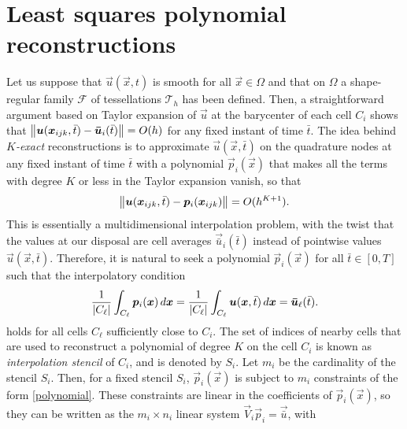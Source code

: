 \section{Least squares polynomial reconstructions}
\label{sec:ls-polynomial-reconstructions}
Let us suppose that $\vec{u}(\vec{x},t)$ is smooth for all $\vec{x}\in\Omega$
and that on $\Omega$ a shape-regular family $\mathcal{F}$ of tessellations
$\mathcal{T}_h$ has been defined.
Then, a straightforward argument based on Taylor expansion of $\vec{u}$ at the
barycenter of each cell $C_{i}$ shows that
$\left\lVert \bm{u}(\bm{x}_{ijk},\bar{t})-\bm{\bar{u}}_{i}(\bar{t}) \right\rVert = O(h)$
for any fixed instant of time $\bar{t}$. The idea behind \emph{$K$-exact}
reconstructions is to approximate $\vec{u}(\vec{x},\bar{t})$ on the quadrature
nodes at any fixed instant of time $\bar{t}$ with a polynomial $\vec{p}_{i}(\vec{x})$
that makes all the terms with degree $K$ or less in the Taylor expansion vanish,
so that
\[
\left\lVert \bm{u}(\bm{x}_{ijk},\bar{t}) - \bm{p}_{i}(\bm{x}_{ijk}) \right\rVert = O(h^{K+1}).
\]
This is essentially a multidimensional interpolation problem, with the twist
that the values at our disposal are cell averages $\vec{\bar{u}}_{i}(\bar{t})$
instead of pointwise values $\vec{u}(\vec{x},\bar{t})$. Therefore, it is natural
to seek a polynomial $\vec{p}_i(\vec{x})$ for all $\bar{t}\in[0,T]$ such that the
interpolatory condition
\begin{equation} \label{polynomial}
\frac{1}{\left|C_{\ell}\right|}\int_{C_{\ell}}\bm{p}_i(\bm{x}) \, d\bm{x}
=\frac{1}{\left|C_{\ell}\right|}\int_{C_{\ell}}\bm{u}(\bm{x},\bar{t}) \, d\bm{x}
=\bm{\bar{u}}_{\ell}(\bar{t}).
\end{equation}
holds for all cells $C_{\ell}$ sufficiently close to $C_{i}$.
The set of indices of nearby cells that are used to reconstruct a polynomial
of degree $K$ on the cell $C_{i}$ is known as \emph{interpolation stencil}
of $C_{i}$, and is denoted by $S_{i}$. Let $m_{i}$ be the cardinality of
the stencil $S_{i}$.	Then, for a fixed stencil $S_{i}$, $\vec{p}_{i}(\vec{x})$ is
subject to $m_{i}$ constraints of the form \eqref{polynomial}. These constraints
are linear in the coefficients of $\vec{p}_{i}(\vec{x})$, so they can be written
as the $m_{i}\times n_{i}$ linear system $\vec{V}_{i}\vec{p}_{i}=\vec{\bar{u}}$,
with
